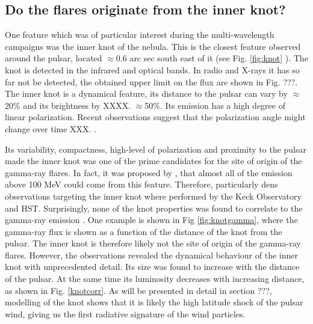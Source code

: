 \subsection{Do the flares originate from the inner knot?}  One feature which was of particular interest during the multi-wavelength campaigns was the inner knot of the nebula. This is the closest feature observed around the pulsar, located $\approx$0.6 arc sec south east of it (see Fig. \ref{fig:knot} ). The knot is detected in the infrared and optical bands. In radio and X-rays it has so far not be detected, the obtained upper limit on the flux are shown in Fig. ???. The inner knot is a dynamical feature, its distance to the pulsar can vary by $\approx$20\%  and its brightness by XXXX. $\approx$50\%.  Its emission has a high degree of linear polarization. Recent observations suggest that the polarization angle might change over time XXX. \citep{moran2015}. 

Its variability, compactness, high-level of polarization and proximity to the pulsar made the inner knot was one of the prime candidates for the site of origin of the gamma-ray flares.  In fact, it was proposed by , that almost all of the emission above 100 MeV could come from this feature. Therefore, particularly dens observations targeting the inner knot where performed by the Keck Observatory and HST. Surprisingly, none of the knot properties was found to correlate to the gamma-ray emission \cite{rudy2015}. One example is shown in Fig \ref{fig:knotgamma},  where the gamma-ray flux is shown as a function of the distance of the knot from the pulsar. The inner knot is therefore likely not the site of origin of the gamma-ray flares. However, the observations revealed the dynamical behaviour of the inner knot with unprecedented detail. Its size was found to increase with the distance of the pulsar. At the same time its luminosity decreases with increasing distance, as shown in Fig. \ref{knotcorr}.  As will be presented in detail in section ???, modelling of the knot shows that it is likely the high latitude shock of the pulsar wind, giving us the first radiative signature of the wind particles.